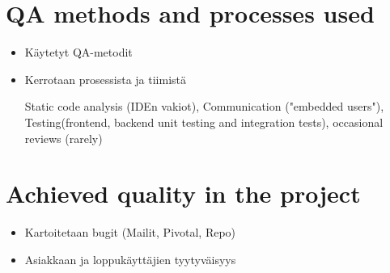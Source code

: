 
 \section{QA methods and processes used}
 
 \begin{itemize}
 
 \item Käytetyt QA-metodit
 \item Kerrotaan prosessista ja tiimistä
 
Static code analysis (IDEn vakiot), Communication ("embedded users"), Testing(frontend, backend unit testing and integration tests), occasional reviews (rarely)

 \end{itemize}
 
 \section{Achieved quality in the project}

 \begin{itemize}
 
 \item Kartoitetaan bugit (Mailit, Pivotal, Repo)  
 \item Asiakkaan ja loppukäyttäjien tyytyväisyys
 
 \end{itemize}
 